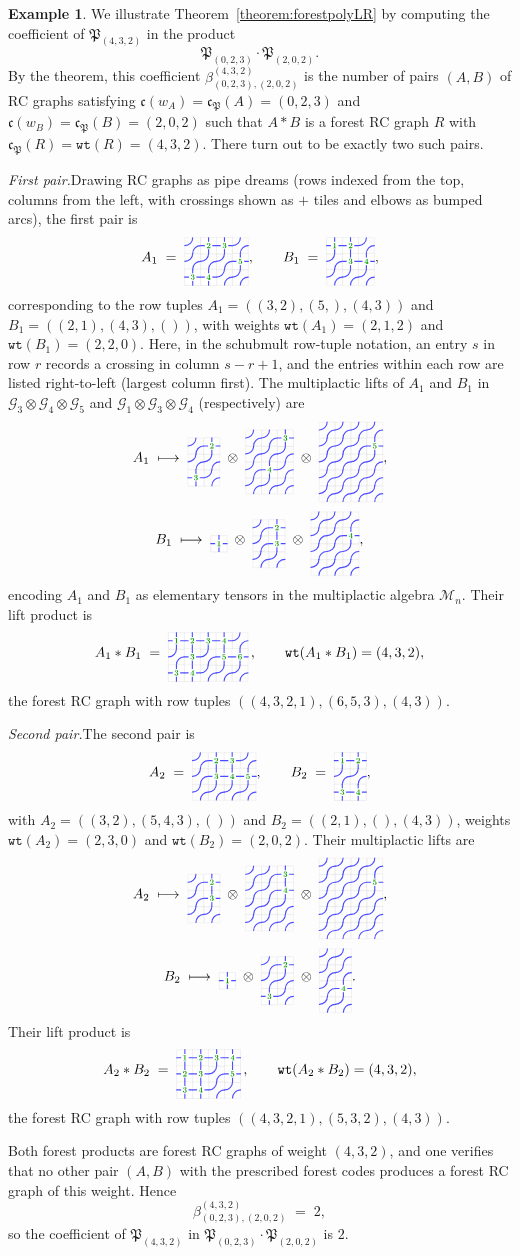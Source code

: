 \documentclass[a4paper,fleqn]{cas-sc}
\theoremstyle{definition}
\newtheorem{example}[lemma]{Example}
\theoremstyle{remark}
\numberwithin{equation}{subsection}
\newcommand{\wof}[1]{w_{#1}}
\newcommand{\wtt}{\mathtt{wt}}
\newcommand{\grass}{\mathcal{G}}
\newcommand{\code}{\mathfrak{c}}
\newcommand{\forest}{\mathfrak{P}}
\begin{document}
\begin{example}\label{example:forestlrproduct}
We illustrate Theorem~\ref{theorem:forestpolyLR} by computing the coefficient of $\forest_{(4,3,2)}$ in the product
$$\forest_{(0,2,3)}\cdot\forest_{(2,0,2)}.$$
By the theorem, this coefficient $\beta_{(0,2,3),(2,0,2)}^{(4,3,2)}$ is the number of pairs $(A,B)$ of RC graphs satisfying $\code(\wof{A})=\code_\forest(A)=(0,2,3)$ and $\code(\wof{B})=\code_\forest(B)=(2,0,2)$ such that $A*B$ is a forest RC graph $R$ with $\code_\forest(R)=\wtt(R)=(4,3,2)$. There turn out to be exactly two such pairs.

\smallskip
\noindent\emph{First pair.}\quad Drawing RC graphs as pipe dreams (rows indexed from the top, columns from the left, with crossings shown as $+$ tiles and elbows as bumped arcs), the first pair is
$$A_1 \;=\; \pd{3}{4}{1/2,1/3,2/4,3/1,3/2}, \qquad B_1 \;=\; \pd{3}{3}{1/1,1/2,2/2,2/3},$$
corresponding to the row tuples $A_1=((3,2),(5,),(4,3))$ and $B_1=((2,1),(4,3),())$, with weights $\wtt(A_1)=(2,1,2)$ and $\wtt(B_1)=(2,2,0)$. Here, in the schubmult row-tuple notation, an entry $s$ in row $r$ records a crossing in column $s-r+1$, and the entries within each row are listed right-to-left (largest column first). The multiplactic lifts of $A_1$ and $B_1$ in $\grass_3\otimes\grass_4\otimes\grass_5$ and $\grass_1\otimes\grass_3\otimes\grass_4$ (respectively) are
$$A_1 \;\longmapsto\; \pd{3}{2}{1/2,3/1}\;\otimes\;\pd{4}{3}{1/3,3/2}\;\otimes\;\pd{5}{4}{2/4},$$
$$B_1 \;\longmapsto\; \pd{1}{1}{1/1}\;\otimes\;\pd{3}{2}{1/2,2/2}\;\otimes\;\pd{4}{3}{2/3},$$
encoding $A_1$ and $B_1$ as elementary tensors in the multiplactic algebra $\mathcal{M}_n$. Their lift product is
$$A_1 * B_1 \;=\; \pd{3}{5}{1/1,1/2,1/3,1/4,2/2,2/4,2/5,3/1,3/2}\,, \qquad \wtt(A_1*B_1)=(4,3,2),$$
the forest RC graph with row tuples $((4,3,2,1),(6,5,3),(4,3))$.

\smallskip
\noindent\emph{Second pair.}\quad The second pair is
$$A_2 \;=\; \pd{3}{4}{1/2,1/3,2/2,2/3,2/4}, \qquad B_2 \;=\; \pd{3}{2}{1/1,1/2,3/1,3/2},$$
with $A_2=((3,2),(5,4,3),())$ and $B_2=((2,1),(),(4,3))$, weights $\wtt(A_2)=(2,3,0)$ and $\wtt(B_2)=(2,0,2)$. Their multiplactic lifts are
$$A_2 \;\longmapsto\; \pd{3}{2}{1/2,2/2}\;\otimes\;\pd{4}{3}{1/3,2/3}\;\otimes\;\pd{5}{4}{2/4},$$
$$B_2 \;\longmapsto\; \pd{1}{1}{1/1}\;\otimes\;\pd{3}{2}{1/2,3/1}\;\otimes\;\pd{4}{2}{3/2}.$$
Their lift product is
$$A_2 * B_2 \;=\; \pd{3}{4}{1/1,1/2,1/3,1/4,2/1,2/2,2/4,3/1,3/2}\,, \qquad \wtt(A_2*B_2)=(4,3,2),$$
the forest RC graph with row tuples $((4,3,2,1),(5,3,2),(4,3))$.

\smallskip
Both forest products are forest RC graphs of weight $(4,3,2)$, and one verifies that no other pair $(A,B)$ with the prescribed forest codes produces a forest RC graph of this weight. Hence
$$\beta_{(0,2,3),(2,0,2)}^{(4,3,2)} \;=\; 2,$$
so the coefficient of $\forest_{(4,3,2)}$ in $\forest_{(0,2,3)}\cdot\forest_{(2,0,2)}$ is $2$.

\end{example}
\end{document}
